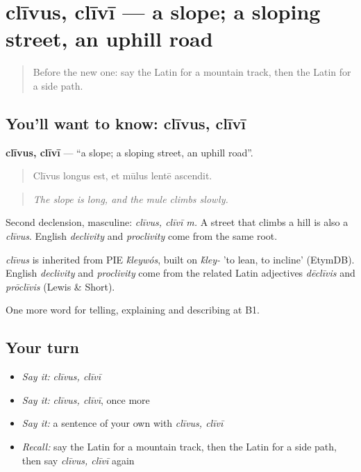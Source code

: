 \section[clīvus, clīvī]{clīvus, clīvī — a slope; a sloping street, an uphill road}

\label{lesson:LA-C423-clivus}



\begin{quote}
Before the new one: say the Latin for a mountain track, then the Latin for a side path.
\end{quote}

\subsection*{You'll want to know: clīvus, clīvī}
\textbf{clīvus, clīvī} — \textquotedblleft{}a slope; a sloping street, an uphill road\textquotedblright{}.

\begin{quote}
Clīvus longus est, et mūlus lentē ascendit.
\end{quote}

\begin{quote}
\emph{The slope is long, and the mule climbs slowly.}
\end{quote}

Second declension, masculine: \emph{clīvus, clīvī m.} A street that climbs a hill is also a \emph{clīvus}. English \emph{declivity} and \emph{proclivity} come from the same root.

\begin{cousinweb}
\emph{clīvus} is inherited from PIE \emph{\'{k}leywós}, built on \emph{\'{k}ley-} 'to lean, to incline' (EtymDB). English \emph{declivity} and \emph{proclivity} come from the related Latin adjectives \emph{dēclīvis} and \emph{prōclīvis} (Lewis \& Short).
\end{cousinweb}

\begin{grammarlens}[title={What you've built}]
One more word for telling, explaining and describing at B1.
\end{grammarlens}

\subsection*{Your turn}
\begin{itemize}
\raggedright
  \item \emph{Say it:} \emph{clīvus, clīvī}
  \item \emph{Say it:} \emph{clīvus, clīvī}, once more
  \item \emph{Say it:} a sentence of your own with \emph{clīvus, clīvī}
  \item \emph{Recall:} say the Latin for a mountain track, then the Latin for a side path, then say \emph{clīvus, clīvī} again
\end{itemize}

